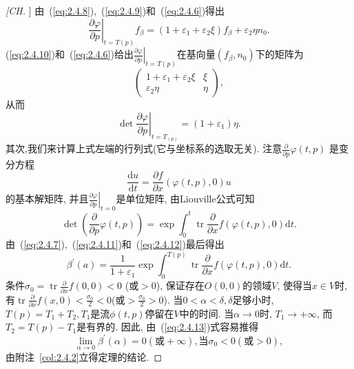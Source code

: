 \begin{proof}[[CH]]
由~(\ref{eq:2.4.8}),~(\ref{eq:2.4.9})和~(\ref{eq:2.4.6})得出
\begin{equation}
  \label{eq:2.4.10}
  \left.\frac{\partial \varphi}{\partial p}\right|_{t=T(p)} f_{\beta}=\left(1+\varepsilon_{1}+\varepsilon_{2} \xi\right) f_{\beta}+\varepsilon_{2} \eta n_{0}.
\end{equation}
(\ref{eq:2.4.10})和~(\ref{eq:2.4.6})给出$\left.\frac{\partial \varphi}{\partial p}\right|_{t=T(p)}$在基向量$(f_{\beta},n_{0})$下的矩阵为
$$
\left(\begin{array}{cc}{1+\varepsilon_{1}+\varepsilon_{2} \xi} & {\xi} \\ {\varepsilon_{2} \eta} & {\eta}\end{array}\right),
$$
从而
\begin{equation}
  \label{eq:2.4.11}
  \operatorname{det}\left.\frac{\partial \varphi}{\partial p}\right|_{t=T_{(p)}}=\left(1+\varepsilon_{1}\right) \eta.
\end{equation}
其次,我们来计算上式左端的行列式(它与坐标系的选取无关).
注意$\frac{\partial}{\partial p} \varphi(t, p)$
是变分方程
$$
\frac{\mathrm{d} u}{\mathrm{d} t}=\frac{\partial f}{\partial x}(\varphi(t, p), 0) u
$$
的基本解矩阵,
并且$\left.\frac{\partial \varphi}{\partial p}\right|_{t=0}$是单位矩阵,
由Liouville公式可知
\begin{equation}
  \label{eq:2.4.12}
  \operatorname{det}\left(\frac{\partial}{\partial p} \varphi(t, p)\right)=\exp \int_{0}^{t} \operatorname{tr} \frac{\partial}{\partial x} f(\varphi(t, p), 0) \mathrm{d} t.
\end{equation}
由~(\ref{eq:2.4.7}),~(\ref{eq:2.4.11})和~(\ref{eq:2.4.12})最后得出
\begin{equation}
  \label{eq:2.4.13}
  \beta^{\prime}(a)=\frac{1}{1+\varepsilon_{1}} \exp \int_{0}^{T(p)} \operatorname{tr} \frac{\partial}{\partial x} f(\varphi(t, p), 0) \mathrm{d} t.
\end{equation}
条件$\sigma_{0}=\operatorname{tr} \frac{\partial}{\partial x} f(0,0)<0$
(或$>0$),
保证存在$O(0,0)$的领域$V$,
使得当$x \in V$时,
有$\operatorname{tr} \frac{\partial}{\partial x} f(x, 0)<\frac{\sigma_{0}}{2}<0$(或$>\frac{\sigma_{0}}{2}>0$).
当$0<\alpha<\delta, \delta$足够小时,
$T(p)=T_{1}+T_{2}, T_{1}$是流$\phi(t,p)$停留在$V$中的时间.
当$\alpha \to 0$时,
$T_1 \to +\infty$,
而$T_{2}=T(p)-T_{1}$是有界的.
因此,
由~(\ref{eq:2.4.13})式容易推得
$$
\lim _{\alpha \rightarrow 0} \beta^{\prime}(\alpha)=0
(\text{或} +\infty),
\text{当}
\sigma_0<0
(\text{或} >0),
$$
由附注~\ref{col:2.4.2}立得定理的结论.
\end{proof}

